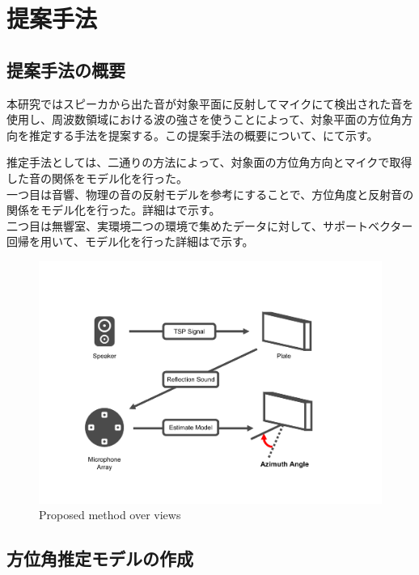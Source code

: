 \section{提案手法}
\label{chap:proposed_method}
\subsection{提案手法の概要}
\label{sec:proposed_method_overviews}
本研究ではスピーカから出た音が対象平面に反射してマイクにて検出された音を使用し、周波数領域における波の強さを使うことによって、対象平面の方位角方向を推定する手法を提案する。この提案手法の概要について、にて示す。

推定手法としては、二通りの方法によって、対象面の方位角方向とマイクで取得した音の関係をモデル化を行った。\\
一つ目は音響、物理の音の反射モデルを参考にすることで、方位角度と反射音の関係をモデル化を行った。詳細はで示す。\\
二つ目は無響室、実環境二つの環境で集めたデータに対して、サポートベクター回帰を用いて、モデル化を行った詳細はで示す。

\begin{figure}[h]
    \centering
    \includegraphics[width=\linewidth]{images/2_proposed_method.pdf}
    \caption{Proposed method over views}
    \label{fig:proposed_method_overview}
\end{figure}

\subsection{方位角推定モデルの作成}
\label{sec:self_by_myself}
